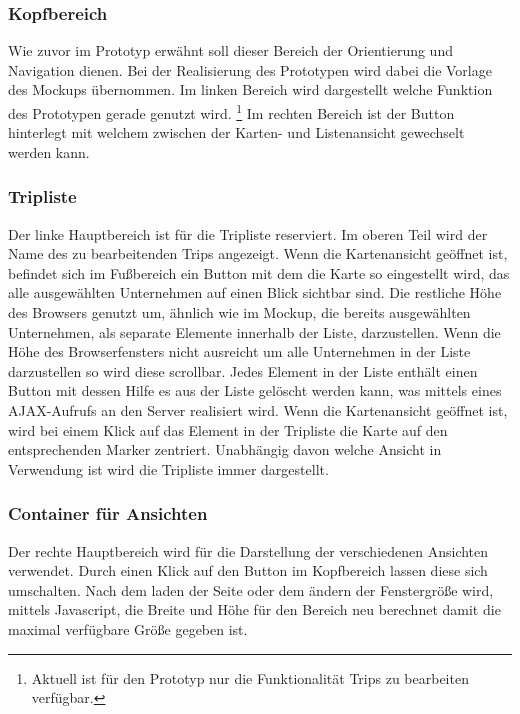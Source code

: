 \documentclass[Bachelorarbeit.tex]{subfiles}
\begin{document}
\subsubsection*{Kopfbereich}
Wie zuvor im Prototyp erwähnt soll dieser Bereich der Orientierung und Navigation dienen.
Bei der Realisierung des Prototypen wird dabei die Vorlage des Mockups übernommen.
Im linken Bereich wird dargestellt welche Funktion des Prototypen gerade genutzt wird.
	\footnote{Aktuell ist für den Prototyp nur die Funktionalität Trips zu bearbeiten verfügbar.}
Im rechten Bereich ist der Button hinterlegt mit welchem zwischen der Karten- und Listenansicht gewechselt werden kann.

\subsubsection*{Tripliste}
Der linke Hauptbereich ist für die Tripliste reserviert.
Im oberen Teil wird der Name des zu bearbeitenden Trips angezeigt.
Wenn die Kartenansicht geöffnet ist, befindet sich im Fußbereich ein Button mit dem die Karte so eingestellt wird, das alle ausgewählten Unternehmen auf einen Blick sichtbar sind.
Die restliche Höhe des Browsers genutzt um, ähnlich wie im Mockup, die bereits ausgewählten Unternehmen, als separate Elemente innerhalb der Liste, darzustellen.
Wenn die Höhe des Browserfensters nicht ausreicht um alle Unternehmen in der Liste darzustellen so wird diese scrollbar.
Jedes Element in der Liste enthält einen Button mit dessen Hilfe es aus der Liste gelöscht werden kann, was mittels eines \ac{AJAX}-Aufrufs an den Server realisiert wird. 
Wenn die Kartenansicht geöffnet ist, wird bei einem Klick auf das Element in der Tripliste die Karte auf den entsprechenden Marker zentriert.
Unabhängig davon welche Ansicht in Verwendung ist wird die Tripliste immer dargestellt.

\subsubsection*{Container für Ansichten}
Der rechte Hauptbereich wird für die Darstellung der verschiedenen Ansichten verwendet. 
Durch einen Klick auf den Button im Kopfbereich lassen diese sich umschalten.
Nach dem laden der Seite oder dem ändern der Fenstergröße wird, mittels Javascript, die Breite und Höhe für den Bereich neu berechnet damit die maximal verfügbare Größe gegeben ist. 
\end{document}
